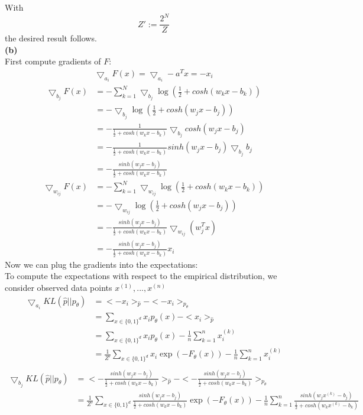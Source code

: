\documentclass[a4paper]{article}
\newcommand{\1}{\mathds{1}}
\begin{document}
With \[ Z':=\frac{2^N}{Z} \]
the desired result follows.\\
\textbf{(b)}\\
First compute gradients of $F$:
\begin{align*}
\bigtriangledown_{a_i}F(x)=\bigtriangledown_{a_i}-a^Tx=-x_i
\end{align*}
\begin{align*}
\bigtriangledown_{b_j}F(x)&=-\sum_{k=1}^{N}\bigtriangledown_{b_j}\log(\frac{1}{2}+cosh(w_kx-b_k))\\
&=-\bigtriangledown_{b_j}\log(\frac{1}{2}+cosh(w_jx-b_j))\\
&=-\frac{1}{\frac{1}{2}+cosh(w_kx-b_k)}\bigtriangledown_{b_j}cosh(w_jx-b_j)\\
&=-\frac{1}{\frac{1}{2}+cosh(w_kx-b_k)}sinh(w_jx-b_j)\bigtriangledown_{b_j}b_j\\
&=-\frac{sinh(w_jx-b_j)}{\frac{1}{2}+cosh(w_kx-b_k)}
\end{align*}
\begin{align*}
\bigtriangledown_{w_{ij}}F(x)&=-\sum_{k=1}^{N}\bigtriangledown_{w_{ij}}\log(\frac{1}{2}+cosh(w_kx-b_k))\\
&=-\bigtriangledown_{w_{ij}}\log(\frac{1}{2}+cosh(w_jx-b_j))\\
&=-\frac{sinh(w_jx-b_j)}{\frac{1}{2}+cosh(w_kx-b_k)}\bigtriangledown_{w_{ij}}(w_j^Tx)\\
&=-\frac{sinh(w_jx-b_j)}{\frac{1}{2}+cosh(w_kx-b_k)}x_i
\end{align*}
Now we can plug the gradients into the expectations:\\
To compute the expectations with respect to the empirical distribution, we consider observed data points $x^{(1)},...,x^{(n)}$
\begin{align*}
\bigtriangledown_{a_i}KL(\hat{p}||p_{\theta})&=<-x_i>_{\hat{p}}-<-x_i>_{p_{\theta}}\\
&=\sum_{x\in\{0,1\}^d}x_ip_{\theta}(x)-<x_i>_{\hat{p}}\\
&=\sum_{x\in\{0,1\}^d}x_ip_{\theta}(x)-\frac{1}{n}\sum_{k=1}^{n}x^{(k)}_i\\
&=\frac{1}{Z'}\sum_{x\in\{0,1\}^d}x_i\exp(-F_{\theta}(x))-\frac{1}{n}\sum_{k=1}^{n}x^{(k)}_i\\
\end{align*}
\begin{align*}
\bigtriangledown_{b_j}KL(\hat{p}||p_{\theta})&=<-\frac{sinh(w_jx-b_j)}{\frac{1}{2}+cosh(w_kx-b_k)}>_{\hat{p}}-<-\frac{sinh(w_jx-b_j)}{\frac{1}{2}+cosh(w_kx-b_k)}>_{p_{\theta}}\\
&=\frac{1}{Z'}\sum_{x\in\{0,1\}^d}\frac{sinh(w_jx-b_j)}{\frac{1}{2}+cosh(w_kx-b_k)}\exp(-F_{\theta}(x))-\frac{1}{n}\sum_{k=1}^{n}\frac{sinh(w_jx^{(k)}-b_j)}{\frac{1}{2}+cosh(w_kx^{(k)}-b_k)}\\
\end{align*}
\end{document}
